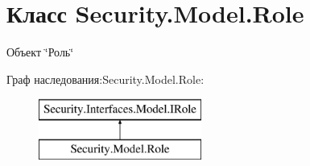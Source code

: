 \hypertarget{class_security_1_1_model_1_1_role}{}\section{Класс Security.\+Model.\+Role}
\label{class_security_1_1_model_1_1_role}


Объект \char`\"{}Роль\char`\"{}  


Граф наследования\+:Security.\+Model.\+Role\+:\begin{figure}[H]
\begin{center}
\leavevmode
\includegraphics[height=2.000000cm]{dd/dad/class_security_1_1_model_1_1_role}
\end{center}
\end{figure}
